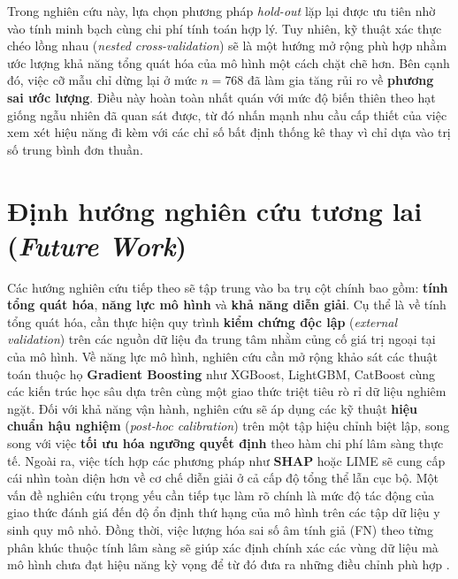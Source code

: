 \documentclass[14pt,a4paper]{extreport}
\begin{document}
Trong nghiên cứu này, lựa chọn phương pháp \textit{hold-out} lặp lại được ưu tiên nhờ vào tính minh bạch cùng chi phí tính toán hợp lý. Tuy nhiên, kỹ thuật xác thực chéo lồng nhau (\textit{nested cross-validation}) sẽ là một hướng mở rộng phù hợp nhằm ước lượng khả năng tổng quát hóa của mô hình một cách chặt chẽ hơn. Bên cạnh đó, việc cỡ mẫu chỉ dừng lại ở mức $n=768$ đã làm gia tăng rủi ro về \textbf{phương sai ước lượng}. Điều này hoàn toàn nhất quán với mức độ biến thiên theo hạt giống ngẫu nhiên đã quan sát được, từ đó nhấn mạnh nhu cầu cấp thiết của việc xem xét hiệu năng đi kèm với các chỉ số bất định thống kê thay vì chỉ dựa vào trị số trung bình đơn thuần.

\section{Định hướng nghiên cứu tương lai (\textit{Future Work})}
\label{subsec:disc-future}

Các hướng nghiên cứu tiếp theo sẽ tập trung vào ba trụ cột chính bao gồm: \textbf{tính tổng quát hóa}, \textbf{năng lực mô hình} và \textbf{khả năng diễn giải}. Cụ thể là về tính tổng quát hóa, cần thực hiện quy trình \textbf{kiểm chứng độc lập} (\textit{external validation}) trên các nguồn dữ liệu đa trung tâm nhằm củng cố giá trị ngoại tại của mô hình. Về năng lực mô hình, nghiên cứu cần mở rộng khảo sát các thuật toán thuộc họ \textbf{Gradient Boosting} như XGBoost, LightGBM, CatBoost cùng các kiến trúc học sâu dựa trên cùng một giao thức triệt tiêu rò rỉ dữ liệu nghiêm ngặt. Đối với khả năng vận hành, nghiên cứu sẽ áp dụng các kỹ thuật \textbf{hiệu chuẩn hậu nghiệm} (\textit{post-hoc calibration}) trên một tập hiệu chỉnh biệt lập, song song với việc \textbf{tối ưu hóa ngưỡng quyết định} theo hàm chi phí lâm sàng thực tế. Ngoài ra, việc tích hợp các phương pháp như \textbf{SHAP} hoặc LIME sẽ cung cấp cái nhìn toàn diện hơn về cơ chế diễn giải ở cả cấp độ tổng thể lẫn cục bộ. Một vấn đề nghiên cứu trọng yếu cần tiếp tục làm rõ chính là mức độ tác động của giao thức đánh giá đến độ ổn định thứ hạng của mô hình trên các tập dữ liệu y sinh quy mô nhỏ. Đồng thời, việc lượng hóa sai số âm tính giả (FN) theo từng phân khúc thuộc tính lâm sàng sẽ giúp xác định chính xác các vùng dữ liệu mà mô hình chưa đạt hiệu năng kỳ vọng để từ đó đưa ra những điều chỉnh phù hợp \cite{kirbas2025shap}.
\end{document}
